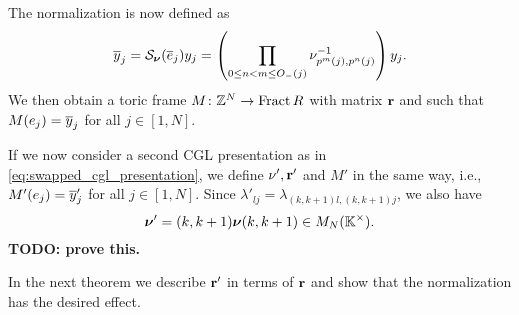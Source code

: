 The normalization is now defined as
\begin{equation*}
	\overline{y}_j = \mathcal{S}_{\boldsymbol{\nu}}(\overline{e}_j) y_j = \left(\prod_{0 \leq n < m \leq O_{-}(j)}\nu^{-1}_{p^m(j),p^n(j)}\right) y_j.
\end{equation*}
%
We then obtain a toric frame $M \colon \mathbb{Z}^N \to \operatorname{Fract}{R}$ with matrix $\mathbf{r}$ and
such that $M(e_j) = \overline{y}_j$ for all $j \in [1, N]$.

\medskip

If we now consider a second CGL presentation as in \cref{eq:swapped_cgl_presentation},
we define $\nu', \mathbf{r}'$ and $M'$ in the same way, i.e., $M'(e_j) = \overline{y}'_j$ for all $j
	\in [1, N]$. Since $\lambda'_{lj} = \lambda_{(k, k+1)l, (k, k+1)j}$, we also have
\begin{equation*}
	\boldsymbol{\nu}' = (k, k+1)\boldsymbol{\nu} (k, k+1) \in M_N(\mathbb{K}^\times).
\end{equation*}
\textbf{TODO: prove this.}

In the next theorem we describe $\mathbf{r}'$ in terms of $\mathbf{r}$ and show that the
normalization has the desired effect.

